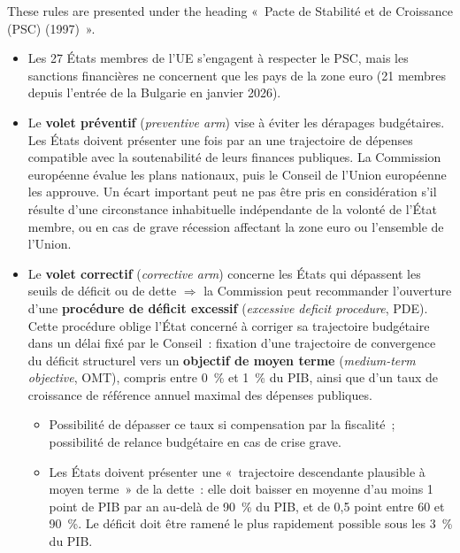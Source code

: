\begin{remark}
  These rules are presented under the heading «~Pacte de Stabilité et de Croissance
  (PSC) (1997)~».
\end{remark}

\begin{itemize}
  \item Les 27 États membres de l'UE s'engagent à respecter le PSC, mais les sanctions
    financières ne concernent que les pays de la zone euro (21 membres depuis l'entrée
    de la Bulgarie en janvier 2026).
  \item Le \textbf{volet préventif} (\textit{preventive arm}) vise à éviter les
    dérapages budgétaires. Les États doivent présenter une fois par an une trajectoire
    de dépenses compatible avec la soutenabilité de leurs finances publiques. La
    Commission européenne évalue les plans nationaux, puis le Conseil de l'Union
    européenne les approuve. Un écart important peut ne pas être pris en considération
    s'il résulte d'une circonstance inhabituelle indépendante de la volonté de l'État
    membre, ou en cas de grave récession affectant la zone euro ou l'ensemble de
    l'Union.
  \item Le \textbf{volet correctif} (\textit{corrective arm}) concerne les États qui
    dépassent les seuils de déficit ou de dette $\Rightarrow$ la Commission peut
    recommander l'ouverture d'une \textbf{procédure de déficit excessif}
    (\textit{excessive deficit procedure}, PDE). Cette procédure oblige l'État concerné à
    corriger sa trajectoire budgétaire dans un délai fixé par le Conseil~: fixation
    d'une trajectoire de convergence du déficit structurel vers un \textbf{objectif de
    moyen terme} (\textit{medium-term objective}, OMT), compris entre 0~\% et 1~\% du
    PIB, ainsi que d'un taux de croissance de référence annuel maximal des dépenses
    publiques.
    \begin{itemize}
      \item Possibilité de dépasser ce taux si compensation par la fiscalité~;
        possibilité de relance budgétaire en cas de crise grave.
      \item Les États doivent présenter une «~trajectoire descendante plausible à moyen
        terme~» de la dette~: elle doit baisser en moyenne d'au moins 1 point de PIB
        par an au-delà de 90~\% du PIB, et de 0,5 point entre 60 et 90~\%. Le déficit
        doit être ramené le plus rapidement possible sous les 3~\% du PIB.
    \end{itemize}
\end{itemize}

